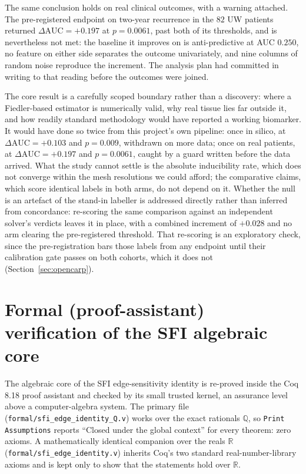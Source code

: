 \documentclass[11pt]{article}
\theoremstyle{definition}
\newcommand{\dAUC}{\Delta\mathrm{AUC}}
\newcommand{\code}[1]{\texttt{#1}}
\begin{document}
The same conclusion holds on real clinical outcomes, with a warning attached.
The pre-registered endpoint on two-year recurrence in the $82$ UW patients
returned $\dAUC=+0.197$ at $p=0.0061$, past both of its thresholds, and is
nevertheless not met: the baseline it improves on is anti-predictive at AUC
$0.250$, no feature on either side separates the outcome univariately, and nine
columns of random noise reproduce the increment. The analysis plan had committed
in writing to that reading before the outcomes were joined.

The core result is a carefully scoped boundary rather than a discovery: where a
Fiedler-based estimator is numerically valid, why real tissue lies far outside
it, and how readily standard methodology would have reported a working
biomarker. It would have done so twice from this project's own pipeline: once in
silico, at $\dAUC=+0.103$ and $p=0.009$, withdrawn on more data; once on real
patients, at $\dAUC=+0.197$ and $p=0.0061$, caught by a guard written before the
data arrived. What the study cannot settle is the absolute inducibility rate,
which does not converge within the mesh resolutions we could afford; the
comparative claims, which score identical labels in both arms, do not depend on
it. Whether the null is an artefact of the stand-in labeller is addressed
directly rather than inferred from concordance: re-scoring the same comparison
against an independent solver's verdicts leaves it in place, with a combined
increment of $+0.028$ and no arm clearing the pre-registered threshold. That
re-scoring is an exploratory check, since the pre-registration bars those labels
from any endpoint until their calibration gate passes on both cohorts, which it
does not (Section~\ref{sec:opencarp}).

\appendix
\section{Formal (proof-assistant) verification of the SFI algebraic core}
\label{app:formal}
The algebraic core of the SFI edge-sensitivity identity is re-proved inside the
Coq 8.18 proof assistant and checked by its small trusted kernel, an assurance
level above a computer-algebra system. The primary file
(\code{formal/sfi\_edge\_identity\_Q.v}) works over the exact rationals
$\mathbb{Q}$, so \code{Print Assumptions} reports ``Closed under the global
context'' for every theorem: zero axioms. A mathematically identical
companion over the reals $\mathbb{R}$ (\code{formal/sfi\_edge\_identity.v})
inherits Coq's two standard real-number-library axioms and is kept only to show
that the statements hold over $\mathbb{R}$.
\end{document}
